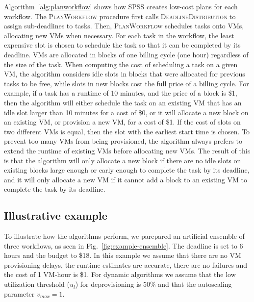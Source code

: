 \documentclass[preprint,5p]{elsarticle}
\begin{document}
Algorithm~\ref{alg:planworkflow} shows how SPSS creates low-cost plans for each
workflow. The \textsc{PlanWorkflow} procedure first calls
\textsc{DeadlineDistribution} to assign sub-deadlines to tasks.
Then, \textsc{PlanWorkflow} schedules
tasks onto VMs, allocating new VMs when necessary. For each task in the
workflow, the least expensive slot is chosen to schedule the task so that it can
be completed by  its deadline. VMs are allocated in blocks of one billing cycle
(one hour) regardless of the size of the task. When computing the cost of
scheduling a task on a given VM, the algorithm considers idle slots in blocks
that were allocated for previous tasks to be free, while slots in new blocks
cost the full price of a billing cycle. 
For example, if a task has a runtime of
10 minutes, and the price of a block is \$1, then the algorithm will either
schedule the task on an existing VM that has an idle slot larger than 10
minutes for a cost of \$0, or it will allocate a new block on an existing VM,
or provision a new VM, for a cost of \$1. 
If the cost of slots on two different
VMs is equal, then the slot with the earliest start time is chosen. To prevent too
many VMs from being provisioned, the algorithm always prefers to extend the
runtime of existing VMs before allocating new VMs. The result of this is that
the algorithm will only allocate a new block if there are no idle slots on
existing blocks large enough or early enough to complete the task by its
deadline, and it will only allocate a new VM if it cannot add a block to an
existing VM to complete the task by its deadline.



\subsection{Illustrative example}

To illustrate how the algorithms perform, we parepared an artificial ensemble 
of three workflows, as seen in Fig.~\ref{fig:example-ensemble}. 
The deadline is set to 6 hours and the budget to \$18. In this example we assume
that there are no VM provisioning delays, the runtime estimates are accurate, 
there are no failures and the cost of 1 VM-hour is \$1.
For dynamic algorithms we assume that the low utilization threshold ($u_l$) for deprovisioning is 50\%
and that the autoscaling parameter $v_{max} = 1$. 
\end{document}
